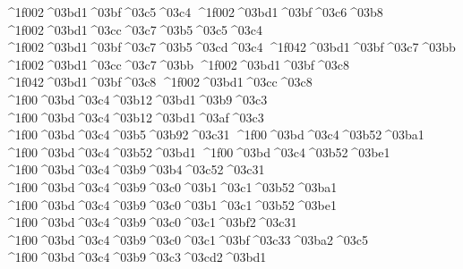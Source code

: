 {^^^^1f002^^^^03bd1^^^^03bf^^^^03c5^^^^03c4
^^^^1f002^^^^03bd1^^^^03bf^^^^03c6^^^^03b8   		%
^^^^1f002^^^^03bd1^^^^03cc^^^^03c7^^^^03b5^^^^03c5^^^^03c4 		%
^^^^1f002^^^^03bd1^^^^03bf^^^^03c7^^^^03b5^^^^03cd^^^^03c4
^^^^1f042^^^^03bd1^^^^03bf^^^^03c7^^^^03bb  		%
^^^^1f002^^^^03bd1^^^^03cc^^^^03c7^^^^03bb
^^^^1f002^^^^03bd1^^^^03bf^^^^03c8    		%
^^^^1f042^^^^03bd1^^^^03bf^^^^03c8   		%
^^^^1f002^^^^03bd1^^^^03cc^^^^03c8
^^^^1f00^^^^03bd^^^^03c4^^^^03b12^^^^03bd1^^^^03b9^^^^03c3  		%
^^^^1f00^^^^03bd^^^^03c4^^^^03b12^^^^03bd1^^^^03af^^^^03c3 		%
^^^^1f00^^^^03bd^^^^03c4^^^^03b5^^^^03b92^^^^03c31   		%
^^^^1f00^^^^03bd^^^^03c4^^^^03b52^^^^03ba1    		%
^^^^1f00^^^^03bd^^^^03c4^^^^03b52^^^^03bd1    		%
^^^^1f00^^^^03bd^^^^03c4^^^^03b52^^^^03be1    		%
^^^^1f00^^^^03bd^^^^03c4^^^^03b9^^^^03b4^^^^03c52^^^^03c31  		%
^^^^1f00^^^^03bd^^^^03c4^^^^03b9^^^^03c0^^^^03b1^^^^03c1^^^^03b52^^^^03ba1 		%
^^^^1f00^^^^03bd^^^^03c4^^^^03b9^^^^03c0^^^^03b1^^^^03c1^^^^03b52^^^^03be1 		%
^^^^1f00^^^^03bd^^^^03c4^^^^03b9^^^^03c0^^^^03c1^^^^03bf2^^^^03c31 		%
	^^^^1f00^^^^03bd^^^^03c4^^^^03b9^^^^03c0^^^^03c1^^^^03bf^^^^03c33^^^^03ba2^^^^03c5 		%
^^^^1f00^^^^03bd^^^^03c4^^^^03b9^^^^03c3^^^^03cd2^^^^03bd1 		%
}
